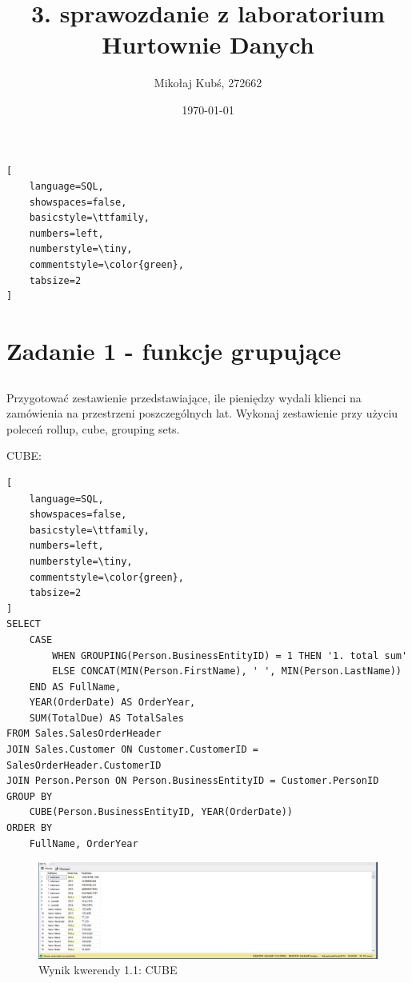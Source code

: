 \documentclass[a4paper,12pt]{article}
\title{3. sprawozdanie z laboratorium Hurtownie Danych}
\author{Mikołaj Kubś, 272662}
\date{\today}
\begin{document}
\maketitle

{\small
\begin{lstlisting}[
	language=SQL,
	showspaces=false,
	basicstyle=\ttfamily,
	numbers=left,
	numberstyle=\tiny,
	commentstyle=\color{green},
	tabsize=2
]
\end{lstlisting}}

\section{Zadanie 1 - funkcje grupujące}

\subsection{}

Przygotować zestawienie przedstawiające, ile pieniędzy wydali klienci na zamówienia
na przestrzeni poszczególnych lat.
Wykonaj zestawienie przy użyciu poleceń rollup, cube, grouping sets.

CUBE:

{\small
\begin{lstlisting}[
	language=SQL,
	showspaces=false,
	basicstyle=\ttfamily,
	numbers=left,
	numberstyle=\tiny,
	commentstyle=\color{green},
	tabsize=2
]
SELECT
    CASE 
        WHEN GROUPING(Person.BusinessEntityID) = 1 THEN '1. total sum'
        ELSE CONCAT(MIN(Person.FirstName), ' ', MIN(Person.LastName))
    END AS FullName,
    YEAR(OrderDate) AS OrderYear,
    SUM(TotalDue) AS TotalSales
FROM Sales.SalesOrderHeader
JOIN Sales.Customer ON Customer.CustomerID = SalesOrderHeader.CustomerID
JOIN Person.Person ON Person.BusinessEntityID = Customer.PersonID
GROUP BY 
    CUBE(Person.BusinessEntityID, YEAR(OrderDate))
ORDER BY 
    FullName, OrderYear
\end{lstlisting}}

\begin{figure}[H]
  \centering
  \includegraphics[width=1.0\textwidth]{images/1.1_cube.png}
  \caption{Wynik kwerendy 1.1: CUBE}
\end{figure}
\end{document}
